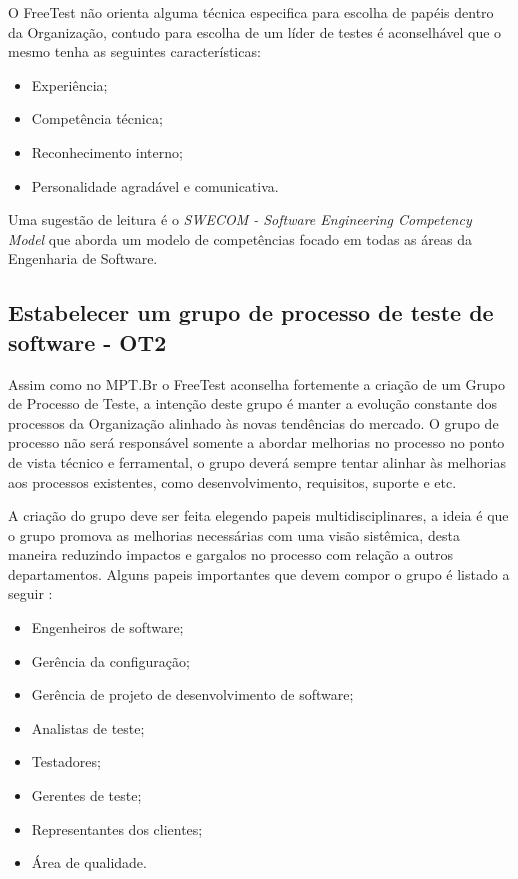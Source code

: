 O FreeTest não orienta alguma técnica especifica para escolha de papéis dentro da Organização, contudo para escolha de um líder de testes é aconselhável que o mesmo tenha as seguintes características:

\begin{itemize}
    \item Experiência;
    \item Competência técnica;
    \item Reconhecimento interno;
    \item Personalidade agradável e comunicativa.
\end{itemize}

Uma sugestão de leitura é o \textit{SWECOM - Software Engineering Competency Model} \cite{swecom2017} que aborda um modelo de competências focado em todas as áreas da Engenharia de Software.

\subsection{Estabelecer um grupo de processo de teste de software - OT2}
\label{sec:guiaot2}

Assim como no MPT.Br \cite{GuiaMPTbr} o FreeTest aconselha fortemente a criação de um Grupo de Processo de Teste, a intenção deste grupo é manter a evolução constante dos processos da Organização alinhado às novas tendências do mercado. O grupo de processo não será responsável somente a abordar melhorias no processo no ponto de vista técnico e ferramental, o grupo deverá sempre tentar alinhar às melhorias aos processos existentes, como desenvolvimento, requisitos, suporte e etc.

A criação do grupo deve ser feita elegendo papeis multidisciplinares, a ideia é que o grupo promova as melhorias necessárias com uma visão sistêmica, desta maneira reduzindo impactos e gargalos no processo com relação a outros departamentos. Alguns papeis importantes que devem compor o grupo é listado a seguir \cite{GuiaMPTbr}:

\begin{itemize}
    \item Engenheiros de software;
    \item Gerência da configuração; 
    \item Gerência de projeto de desenvolvimento de software; 
    \item Analistas de teste; 
    \item Testadores; 
    \item Gerentes de teste; 
    \item Representantes dos clientes; 
    \item Área de qualidade.
\end{itemize}

